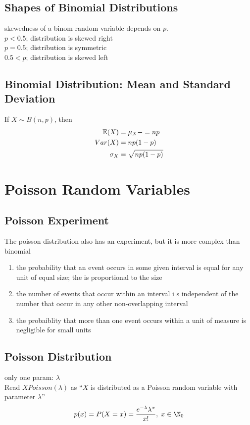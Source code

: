 \subsection{Shapes of Binomial Distributions}
skewedness of a binom random variable depends on $p$. \\
$p<0.5$; distribution is skewed right \\
$p=0.5$; distribution is symmetric  \\
$0.5<p$; distribution is skewed left


\subsection{Binomial Distribution: Mean and Standard Deviation}
If $X\sim B(n,p)$, then
\begin{align}
    \mathbb{E}(X)&=\mu_X-=np\\
    Var(X)&=np(1-p)\\
    \sigma_X&=\sqrt{np(1-p)}
\end{align}

\section{Poisson Random Variables}  %


\subsection{Poisson Experiment}  %
The poisson distribution also has an experiment, but it is more complex than  binomial
\begin{enumerate}
    \item the probability that an event occurs in some given interval is equal for any unit of equal size; the  is proportional to the size
    \item the number of events that occur within an interval i s independent of the number that occur in any other non-overlapping interval
    \item the probaiblity that more than one event occurs within a unit of measure is negligible for small units
\end{enumerate}

\subsection{Poisson Distribution}  %
only one param: $\lambda$ \\
Read $X Poisson(\lambda)$ as ``$X$ is distributed as a Poisson random variable with parameter $\lambda$''
\begin{equation}
    p(x)=P(X=x)=\frac{e^{-\lambda}\lambda^x}{x!},\; x\in\N_0
\end{equation}

